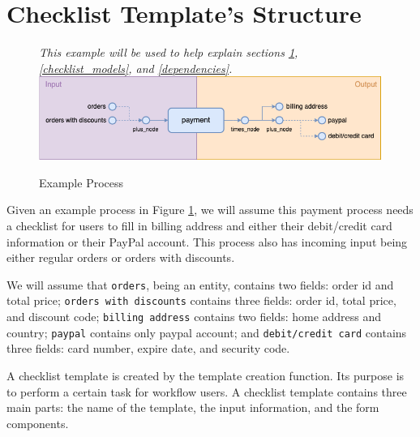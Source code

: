
\section{Checklist Template's Structure}
\label{checklist_strcuture}


\begin{figure}[ht!]
    \centering
    \textit{This example will be used to help explain sections \ref{checklist_strcuture}, \ref{checklist_models}, and \ref{dependencies}.}
    \includegraphics[width=\textwidth]{overleaf/images/template_example.png}
    \caption{Example Process}
    \label{fig:template_example}
\end{figure}

Given an example process in Figure \ref{fig:template_example}, we will assume this payment process needs a checklist for users to fill in billing address and either their debit/credit card information or their PayPal account. This process also has incoming input being either regular orders or orders with discounts.

We will assume that \verb!orders!, being an entity, contains two fields: order id and total price; \verb!orders with discounts! contains three fields: order id, total price, and discount code; \verb!billing address! contains two fields: home address and country; \verb!paypal! contains only paypal account; and \verb!debit/credit card! contains three fields: card number, expire date, and security code.




A checklist template is created by the template creation function. Its purpose is to perform a certain task for workflow users.
A checklist template contains three main parts: the name of the template, the input information, and the form components.

